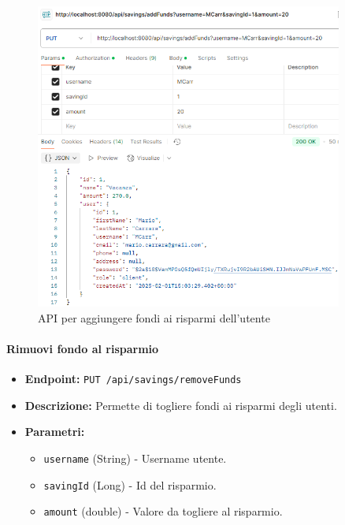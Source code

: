 \begin{figure}[H]
    \centering
    \includegraphics[width=0.9\textwidth]{images/AddFundsSavingAPI.png}
    \caption{API per aggiungere fondi ai risparmi dell'utente}
    \label{fig:AddFundsSavingAPI}
\end{figure}

\paragraph{Rimuovi fondo al risparmio} 


\begin{itemize}
    \item \textbf{Endpoint:} \texttt{PUT /api/savings/removeFunds}
    \item \textbf{Descrizione:} Permette di togliere fondi ai risparmi degli utenti.
    \item \textbf{Parametri:}
    \begin{itemize}
        \item \texttt{username} (String) - Username utente.
        \item \texttt{savingId} (Long) - Id del risparmio.
        \item \texttt{amount} (double) - Valore da togliere al risparmio.
    \end{itemize}
\end{itemize}

